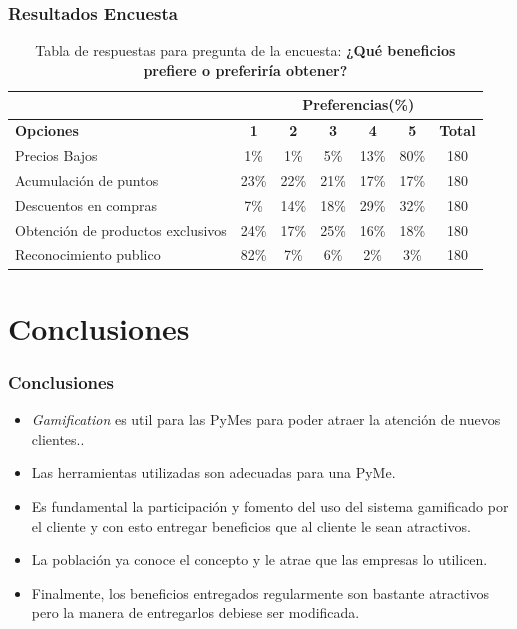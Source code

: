 \documentclass[10pt, compress]{beamer}
\begin{document}
\begin{frame}
 \frametitle{Resultados Encuesta}

\begin{table}[h]
\centering
\footnotesize
\begin{tabular}{|l|c|c|c|c|c|c|}
\hline
 & \multicolumn{6}{c|}{{\bf Preferencias(\%)}} \\
\hline
{\bf Opciones} & {\bf 1} & {\bf 2} & {\bf 3} & {\bf 4} & {\bf 5} & {\bf Total}\\
\hline
Precios Bajos & 1\% & 1\% & 5\% & 13\% & 80\% & 180\\
\hline
Acumulación de puntos & 23\% & 22\% & 21\% & 17\% & 17\% & 180\\
\hline
Descuentos en compras & 7\% & 14\% & 18\% & 29\% & 32\% & 180\\
\hline
Obtención de productos exclusivos & 24\% & 17\% & 25\% & 16\% & 18\% & 180\\
\hline
Reconocimiento publico & 82\% & 7\% & 6\% & 2\% & 3\% & 180\\
\hline
\end{tabular}
\caption{Tabla de respuestas para pregunta de la encuesta: {\bf ¿Qué beneficios prefiere o preferiría obtener?}}
\label{tab:Preg7}
\end{table}

\end{frame}

\section{Conclusiones}

\begin{frame}
 \frametitle{Conclusiones}

\begin{itemize}
\item \emph{Gamification} es util para las PyMes para poder atraer la atención de nuevos clientes..
\item Las herramientas utilizadas son adecuadas para una PyMe.
\item Es fundamental la participación y fomento del uso del sistema gamificado por el cliente y con esto
 entregar beneficios que al cliente le sean atractivos.
\item La población ya conoce el concepto y le atrae que las empresas lo utilicen.
\item Finalmente, los beneficios entregados regularmente son bastante atractivos pero la manera de entregarlos
debiese ser modificada.
\end{itemize}
\end{frame}
\end{document}
